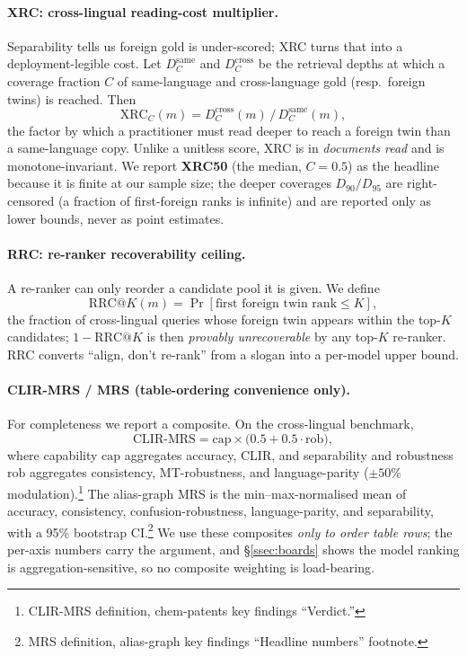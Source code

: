 \documentclass[11pt]{article}
\begin{document}
\paragraph{XRC: cross-lingual reading-cost multiplier.}
Separability tells us foreign gold is under-scored; XRC turns that into a
deployment-legible cost. Let $D_C^{\text{same}}$ and $D_C^{\text{cross}}$ be the
retrieval depths at which a coverage fraction $C$ of same-language and
cross-language gold (resp.\ foreign twins) is reached. Then
\begin{equation}
\label{eq:xrc}
\mathrm{XRC}_C(m) = D_C^{\text{cross}}(m) \,/\, D_C^{\text{same}}(m),
\end{equation}
the factor by which a practitioner must read deeper to reach a foreign twin than
a same-language copy. Unlike a unitless score, XRC is in \emph{documents read}
and is monotone-invariant. We report \textbf{XRC50} (the median, $C{=}0.5$) as
the headline because it is finite at our sample size; the deeper coverages
$D_{90}/D_{95}$ are right-censored (a fraction of first-foreign ranks is
infinite) and are reported only as lower bounds, never as point estimates.

\paragraph{RRC: re-ranker recoverability ceiling.}
A re-ranker can only reorder a candidate pool it is given. We define
\begin{equation}
\label{eq:rrc}
\mathrm{RRC@}K(m) = \Pr\!\left[\text{first foreign twin rank} \le K\right],
\end{equation}
the fraction of cross-lingual queries whose foreign twin appears within the
top-$K$ candidates; $1-\mathrm{RRC@}K$ is then \emph{provably unrecoverable} by
any top-$K$ re-ranker. RRC converts ``align, don't re-rank'' from a slogan into
a per-model upper bound.

\paragraph{CLIR-MRS / MRS (table-ordering convenience only).}
For completeness we report a composite. On the cross-lingual benchmark,
\begin{equation}
\label{eq:clirmrs}
\mathrm{CLIR\text{-}MRS} = \mathrm{cap} \times \bigl(0.5 + 0.5\cdot\mathrm{rob}\bigr),
\end{equation}
where capability $\mathrm{cap}$ aggregates accuracy, CLIR, and separability and
robustness $\mathrm{rob}$ aggregates consistency, MT-robustness, and
language-parity ($\pm50\%$ modulation).\footnote{CLIR-MRS definition,
chem-patents key findings ``Verdict.''} The alias-graph MRS is the
min--max-normalised mean of accuracy, consistency, confusion-robustness,
language-parity, and separability, with a 95\% bootstrap CI.\footnote{MRS
definition, alias-graph key findings ``Headline numbers'' footnote.} We use
these composites \emph{only to order table rows}; the per-axis numbers carry the
argument, and \S\ref{ssec:boards} shows the model ranking is aggregation-sensitive,
so no composite weighting is load-bearing.
\end{document}

